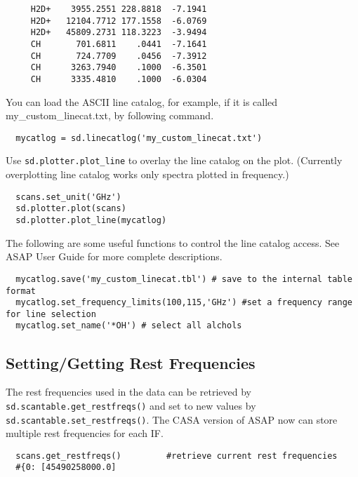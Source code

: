 \small
\begin{verbatim}
     H2D+    3955.2551 228.8818  -7.1941  
     H2D+   12104.7712 177.1558  -6.0769  
     H2D+   45809.2731 118.3223  -3.9494  
     CH       701.6811    .0441  -7.1641  
     CH       724.7709    .0456  -7.3912  
     CH      3263.7940    .1000  -6.3501  
     CH      3335.4810    .1000  -6.0304
\end{verbatim}
\normalsize
You can load the ASCII line catalog, for example, if
it is called my\_custom\_linecat.txt,
by following command.

\small
\begin{verbatim}
  mycatlog = sd.linecatlog('my_custom_linecat.txt')
\end{verbatim}
\normalsize

Use {\tt sd.plotter.plot\_line} to overlay the line catalog on 
the plot. (Currently overplotting line catalog works only spectra plotted
in frequency.)

\small
\begin{verbatim}
  scans.set_unit('GHz')
  sd.plotter.plot(scans)
  sd.plotter.plot_line(mycatlog)
\end{verbatim}
\normalsize

The following are some useful functions to control the line catalog
access. See ASAP User Guide for more complete descriptions.

\small
\begin{verbatim}
  mycatlog.save('my_custom_linecat.tbl') # save to the internal table format
  mycatlog.set_frequency_limits(100,115,'GHz') #set a frequency range for line selection
  mycatlog.set_name('*OH') # select all alchols
\end{verbatim}
\normalsize


\subsection{Setting/Getting Rest Frequencies}
\label{subsection:sd.asap.restfreqs}

The rest frequencies used in the data can be retrieved by 
{\tt sd.scantable.get\_restfreqs()} and set to new values by 
{\tt sd.scantable.set\_restfreqs()}.
The CASA version of ASAP now can store multiple rest frequencies 
for each IF.

\small
\begin{verbatim}
  scans.get_restfreqs()         #retrieve current rest frequencies
  #{0: [45490258000.0]
\end{verbatim}
\normalsize

